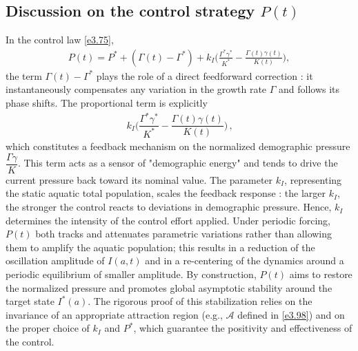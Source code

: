 \documentclass[10pt, a4paper]{amsart}
\theoremstyle{plain}
\theoremstyle{definition}
\theoremstyle{remark}
\numberwithin{equation}{section}
\begin{document}
\subsection*{\bf Discussion on the control strategy \texorpdfstring{$P(t)$}{P(t)}}
In the control law \eqref{e3.75},
\begin{align}
P(t)=P^*+(\Gamma(t)-\Gamma^*)+k_I\Big(\frac{\Gamma^*\gamma^*}{K^*}-\frac{\Gamma(t)\gamma(t)}{K(t)}\Big),
\end{align}
the term $\Gamma(t)-\Gamma^*$ plays the role of a direct feedforward correction : it instantaneously compensates any variation in the growth rate $\Gamma$ and follows its phase shifts. The proportional term is explicitly
\begin{align}
\,k_I\Big(\dfrac{\Gamma^*\gamma^*}{K^*}-\dfrac{\Gamma(t)\gamma(t)}{K(t)}\Big)\,,
\end{align}
which constitutes a feedback mechanism on the normalized demographic pressure $\dfrac{\Gamma\gamma}{K}$. This term acts as a sensor of "demographic energy" and tends to drive the current pressure back toward its nominal value. The parameter $k_I$, representing the static aquatic total population, scales the feedback response : the larger $k_I$, the stronger the control reacts to deviations in demographic pressure. Hence, $k_I$ determines the intensity of the control effort applied. Under periodic forcing, $P(t)$ both tracks and attenuates parametric variations rather than allowing them to amplify the aquatic population; this results in a reduction of the oscillation amplitude of $I(a,t)$ and in a re-centering of the dynamics around a periodic equilibrium of smaller amplitude. By construction, $P(t)$ aims to restore the normalized pressure and promotes global asymptotic stability around the target state $I^*(a)$. The rigorous proof of this stabilization relies on the invariance of an appropriate attraction region (e.g., $\mathcal A$ defined in \eqref{e3.98}) and on the proper choice of $k_I$ and $P^*$, which guarantee the positivity and effectiveness of the control.
\end{document}
